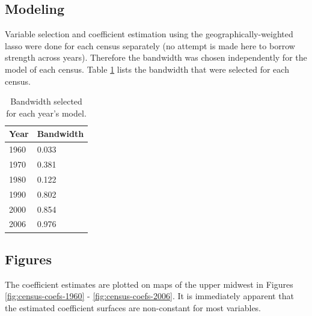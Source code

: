 \documentclass[authoryear, review, 11pt]{elsarticle}
\begin{document}
	\subsection{Modeling}	
	Variable selection and coefficient estimation using the geographically-weighted lasso were done for each census separately (no attempt is made here to borrow strength across years). Therefore the bandwidth was chosen independently for the model of each census. Table \ref{table:census-bandwidth} lists the bandwidth that were selected for each census.
	
	\begin{table}
		\begin{center}
		\begin{tabular}{ll}
			Year & Bandwidth \\
			\hline
			1960 & 0.033\\
			1970 &  0.381\\
			1980 & 0.122\\
			1990 & 0.802\\
			2000 & 0.854\\
			2006 & 0.976\\
		\end{tabular}
		\caption{Bandwidth selected for each year's model.\label{table:census-bandwidth}}
		\end{center}		
	\end{table}
	
	\subsection{Figures}
	The coefficient estimates are plotted on maps of the upper midwest in Figures \ref{fig:census-coefs-1960} - \ref{fig:census-coefs-2006}. It is immediately apparent that the estimated coefficient surfaces are non-constant for most variables.\\
		
\end{document}
